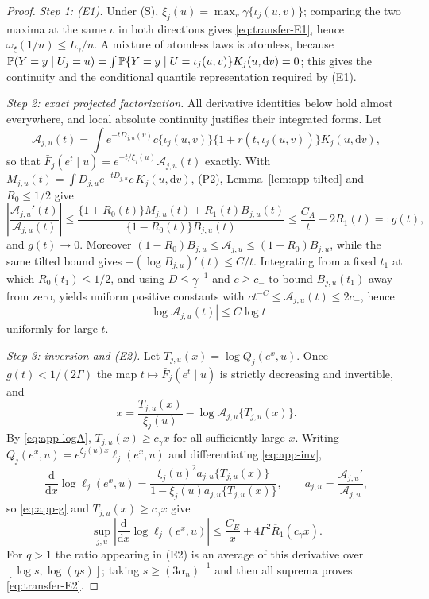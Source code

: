 \documentclass[bj,authoryear]{imsart}
\theoremstyle{plain}
\begin{document}
\begin{appendix}
\begin{proof}
\emph{Step 1: (E1).} Under (S), $\xi_j(u)=\max_v\gamma\{\iota_j(u,v)\}$;
comparing the two maxima at the same $v$ in both directions gives
\eqref{eq:transfer-E1}, hence $\omega_\xi(1/n)\le L_\gamma/n$. A mixture
of atomless laws is atomless, because
$\mathbb P(Y=y\mid U_j=u)=\int\mathbb P\{Y=y\mid U=\iota_j(u,v)\}K_j(u,\mathrm dv)=0$;
this gives the continuity and the conditional quantile representation
required by (E1).

\emph{Step 2: exact projected factorization.} All derivative identities
below hold almost everywhere, and local absolute continuity justifies
their integrated forms. Let
\[
 \mathcal A_{j,u}(t)=\int e^{-tD_{j,u}(v)}c\{\iota_j(u,v)\}
 \{1+r(t,\iota_j(u,v))\}K_j(u,\mathrm dv),
\]
so that $\bar F_j(e^t\mid u)=e^{-t/\xi_j(u)}\mathcal A_{j,u}(t)$
exactly. With $M_{j,u}(t)=\int D_{j,u}e^{-tD_{j,u}}c\,K_j(u,\mathrm dv)$,
(P2), Lemma~\ref{lem:app-tilted} and $R_0\le1/2$ give
\begin{equation}\label{eq:app-g}
 \left|\frac{\mathcal A_{j,u}'(t)}{\mathcal A_{j,u}(t)}\right|
 \le\frac{\{1+R_0(t)\}M_{j,u}(t)+R_1(t)B_{j,u}(t)}
         {\{1-R_0(t)\}B_{j,u}(t)}
 \le\frac{C_A}{t}+2R_1(t)=:g(t),
\end{equation}
and $g(t)\to0$. Moreover
$(1-R_0)B_{j,u}\le\mathcal A_{j,u}\le(1+R_0)B_{j,u}$, while the same
tilted bound gives $-(\log B_{j,u})'(t)\le C/t$. Integrating from a
fixed $t_1$ at which $R_0(t_1)\le1/2$, and using $D\le\underline\gamma^{-1}$
and $c\ge c_-$ to bound $B_{j,u}(t_1)$ away from zero, yields uniform
positive constants with $ct^{-C}\le\mathcal A_{j,u}(t)\le2c_+$, hence
\begin{equation}\label{eq:app-logA}
 |\log\mathcal A_{j,u}(t)|\le C\log t
\end{equation}
uniformly for large $t$.

\emph{Step 3: inversion and (E2).} Let
$T_{j,u}(x)=\log Q_j(e^x,u)$. Once $g(t)<1/(2\Gamma)$ the map
$t\mapsto\bar F_j(e^t\mid u)$ is strictly decreasing and invertible, and
\begin{equation}\label{eq:app-inv}
 x=\frac{T_{j,u}(x)}{\xi_j(u)}-\log\mathcal A_{j,u}\{T_{j,u}(x)\}.
\end{equation}
By \eqref{eq:app-logA}, $T_{j,u}(x)\ge c_\gamma x$ for all sufficiently
large $x$. Writing $Q_j(e^x,u)=e^{\xi_j(u)x}\ell_j(e^x,u)$ and
differentiating \eqref{eq:app-inv},
\[
 \frac{\mathrm d}{\mathrm dx}\log\ell_j(e^x,u)
 =\frac{\xi_j(u)^2a_{j,u}\{T_{j,u}(x)\}}
        {1-\xi_j(u)a_{j,u}\{T_{j,u}(x)\}},
 \qquad
 a_{j,u}=\frac{\mathcal A_{j,u}'}{\mathcal A_{j,u}},
\]
so \eqref{eq:app-g} and $T_{j,u}(x)\ge c_\gamma x$ give
\[
 \sup_{j,u}\left|\frac{\mathrm d}{\mathrm dx}\log\ell_j(e^x,u)\right|
 \le\frac{C_E}{x}+4\Gamma^2\overline R_1(c_\gamma x).
\]
For $q>1$ the ratio appearing in (E2) is an average of this derivative
over $[\log s,\log(qs)]$; taking $s\ge(3\alpha_n)^{-1}$ and then all
suprema proves \eqref{eq:transfer-E2}.


\end{proof}
\end{appendix}
\end{document}
